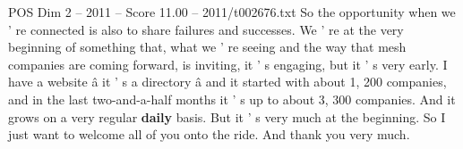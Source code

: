 \begin{textsample}{POS Dim 2 – 2011 – Score 11.00 – 2011/t002676.txt}
So the opportunity when we ' re connected is also to share failures and successes.
We ' re at the very beginning of something that, what we ' re seeing and the way that mesh companies are coming forward, is inviting, it ' s engaging, but it ' s very early.
I have a website â it ' s a directory â and it started with about 1, 200 companies, and in the last two-and-a-half months it ' s up to about 3, 300 companies.
And it grows on a very regular \textbf{daily} basis.
But it ' s very much at the beginning.
So I just want to welcome all of you onto the ride.
And thank you very much.

\end{textsample}
